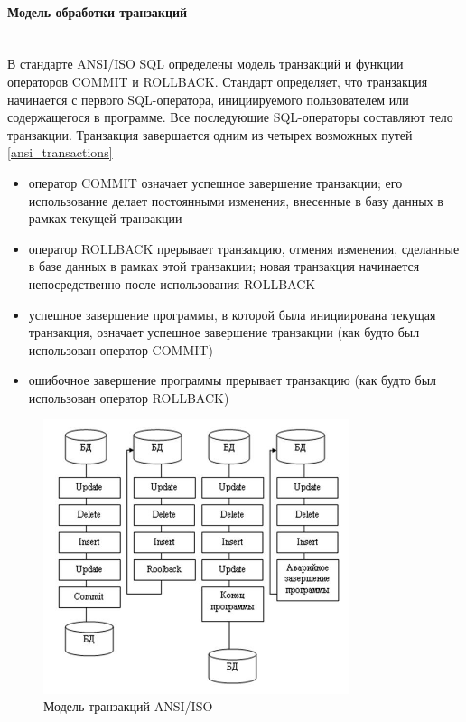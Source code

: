 \paragraph{Модель обработки транзакций} ~\\
В стандарте ANSI/ISO SQL определены модель транзакций и функции операторов COMMIT и ROLLBACK. \autocite{AnsiSqlTrans}
Стандарт определяет, что транзакция начинается с первого SQL-оператора, инициируемого пользователем или содержащегося
в программе. Все последующие SQL-операторы составляют тело транзакции. Транзакция завершается одним из четырех
возможных путей \autoref{ansi_transactions}
\begin{itemize}
    \item оператор COMMIT означает успешное завершение транзакции; его использование делает постоянными изменения,
    внесенные в базу данных в рамках текущей транзакции
    \item оператор ROLLBACK прерывает транзакцию, отменяя изменения, сделанные в базе данных в рамках
    этой транзакции; новая транзакция начинается непосредственно после использования ROLLBACK
    \item успешное завершение программы, в которой была инициирована текущая транзакция,
    означает успешное завершение транзакции (как будто был использован оператор COMMIT)
    \item ошибочное завершение программы прерывает транзакцию (как будто был использован оператор ROLLBACK)
\end{itemize}

\begin{figure}[h!]
    \centering
    \includegraphics[width=0.8\textwidth]{assets/distributed/transactions.jpg}
    \caption{Модель транзакций ANSI/ISO}
	\label{ansi_transactions}
\end{figure}

